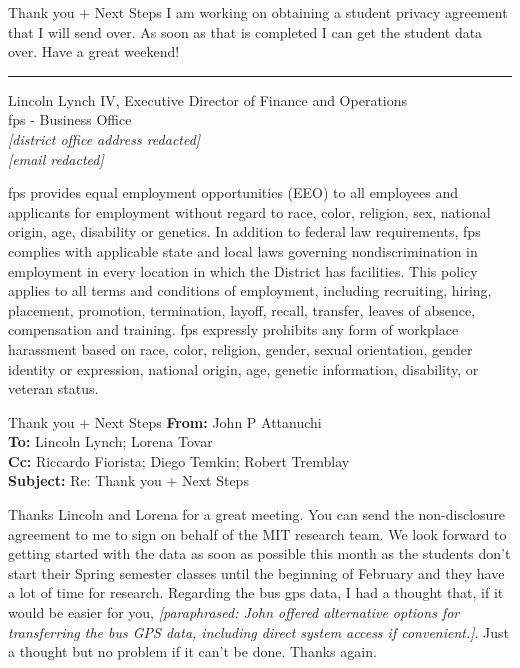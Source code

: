 {\begin{emailbox}{Thank you + Next Steps}
    I am working on obtaining a student privacy agreement that I will send over. As soon as that is completed I can get the student data over. Have a great weekend!
    
    \noindent\rule{\textwidth}{1pt}

    Lincoln Lynch IV, Executive Director of Finance and Operations \\
    \Acrlong{fps} - Business Office \\
    \textit{[district office address redacted]} \\
    \textit{[email redacted]} \vspace{1em}

    \Acrlong{fps} provides equal employment opportunities (EEO) to all employees and applicants for employment without regard to race, color, religion, sex, national origin, age, disability or genetics. In addition to federal law requirements, \acrlong{fps} complies with applicable state and local laws governing nondiscrimination in employment in every location in which the District has facilities. This policy applies to all terms and conditions of employment, including recruiting, hiring, placement, promotion, termination, layoff, recall, transfer, leaves of absence, compensation and training. \acrlong{fps} expressly prohibits any form of workplace harassment based on race, color, religion, gender, sexual orientation, gender identity or expression, national origin, age, genetic information, disability, or veteran status.
\end{emailbox}

\begin{emailbox}{Thank you + Next Steps}
    \textbf{From:} John P Attanuchi \\
    \textbf{To:} Lincoln Lynch; Lorena Tovar \\
    \textbf{Cc:} Riccardo Fiorista; Diego Temkin; Robert Tremblay \\
    \textbf{Subject:} Re: Thank you + Next Steps

    \vspace{1em}
    Thanks Lincoln and Lorena for a great meeting. You can send the non-disclosure agreement to me to sign on behalf of the MIT research team. We look forward to getting started with the data as soon as possible this month as the students don't start their Spring semester classes until the beginning of February and they have a lot of time for research. Regarding the bus \acrshort{gps} data, I had a thought that, if it would be easier for you, \textit{[paraphrased: John offered alternative options for transferring the bus GPS data, including direct system access if convenient.]}. Just a thought but no problem if it can't be done. Thanks again.
    

\end{emailbox}}
